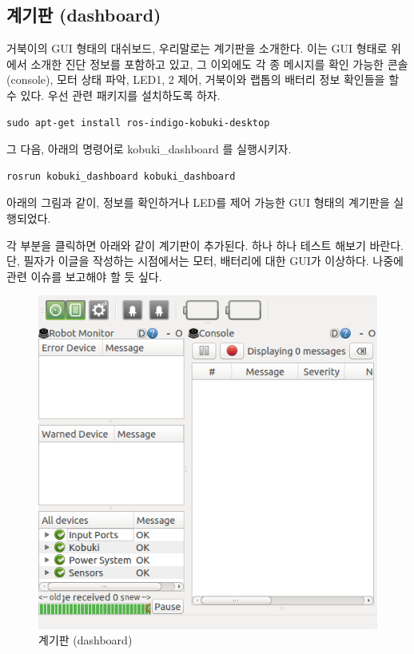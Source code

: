 \subsection{계기판 (dashboard)}

거북이의 GUI 형태의 대쉬보드, 우리말로는 계기판을 소개한다. 이는 GUI 형태로 위에서 소개한 진단 정보를 포함하고 있고, 그 이외에도 각 종 메시지를 확인 가능한 콘솔(console), 모터 상태 파악, LED1, 2 제어, 거북이와 랩톱의 배터리 정보 확인들을 할 수 있다. 우선 관련 패키지를 설치하도록 하자.

\vspace{\baselineskip}
\begin{lstlisting}[language=ROS]
sudo apt-get install ros-indigo-kobuki-desktop
\end{lstlisting}

그 다음, 아래의 명령어로 kobuki\_dashboard 를 실행시키자.

\vspace{\baselineskip}
\begin{lstlisting}[language=ROS]
rosrun kobuki_dashboard kobuki_dashboard
\end{lstlisting}

아래의 그림과 같이, 정보를 확인하거나 LED를 제어 가능한 GUI 형태의 계기판을 실행되었다. 

각 부분을 클릭하면 아래와 같이 계기판이 추가된다. 하나 하나 테스트 해보기 바란다. 단, 필자가 이글을 작성하는 시점에서는 모터, 배터리에 대한 GUI가 이상하다. 나중에 관련 이슈를 보고해야 할 듯 싶다.

\begin{figure}[h]
\centering\includegraphics[width=0.7\columnwidth]{pictures/chapter10/kobuki_dashboard.png}
\caption{계기판 (dashboard)}
\end{figure}

